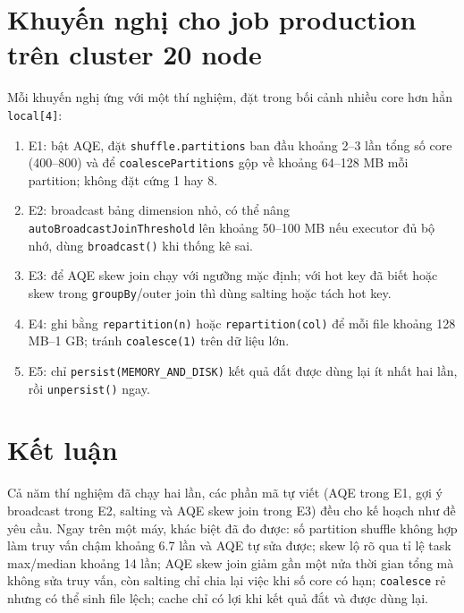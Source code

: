 \documentclass[
  12pt,
  a4paper,
]{article}
\providecommand{\tightlist}{%
  \setlength{\itemsep}{0pt}\setlength{\parskip}{0pt}}
\begin{document}
\section{Khuyến nghị cho job production trên cluster 20
node}\label{sec:l06-reco}

Mỗi khuyến nghị ứng với một thí nghiệm, đặt trong bối cảnh nhiều core
hơn hẳn \texttt{local{[}4{]}}:

\begin{enumerate}
\def\labelenumi{\arabic{enumi}.}
\tightlist
\item
  E1: bật AQE, đặt
  \texttt{shuffle.}\allowbreak{}\texttt{partitions}\allowbreak{} ban đầu
  khoảng 2--3 lần tổng số core (400--800) và để
  \texttt{coalescePartitions}\allowbreak{} gộp về khoảng 64--128 MB mỗi
  partition; không đặt cứng 1 hay 8.
\item
  E2: broadcast bảng dimension nhỏ, có thể nâng
  \texttt{autoBroadcastJoinThreshold}\allowbreak{} lên khoảng 50--100 MB
  nếu executor đủ bộ nhớ, dùng \texttt{broadcast()} khi thống kê sai.
\item
  E3: để AQE skew join chạy với ngưỡng mặc định; với hot key đã biết
  hoặc skew trong \texttt{groupBy}/outer join thì dùng salting hoặc tách
  hot key.
\item
  E4: ghi bằng \texttt{repartition(n)} hoặc
  \texttt{repartition(col)}\allowbreak{} để mỗi file khoảng 128 MB--1
  GB; tránh \texttt{coalesce(1)} trên dữ liệu lớn.
\item
  E5: chỉ
  \texttt{persist(MEMORY\_}\allowbreak{}\texttt{AND\_}\allowbreak{}\texttt{DISK)}\allowbreak{}
  kết quả đắt được dùng lại ít nhất hai lần, rồi \texttt{unpersist()}
  ngay.
\end{enumerate}

\section{Kết luận}\label{sec:l06-conclusion}

Cả năm thí nghiệm đã chạy hai lần, các phần mã tự viết (AQE trong E1,
gợi ý broadcast trong E2, salting và AQE skew join trong E3) đều cho kế
hoạch như đề yêu cầu. Ngay trên một máy, khác biệt đã đo được: số
partition shuffle không hợp làm truy vấn chậm khoảng 6.7 lần và AQE tự
sửa được; skew lộ rõ qua tỉ lệ task max/median khoảng 14 lần; AQE skew
join giảm gần một nửa thời gian tổng mà không sửa truy vấn, còn salting
chỉ chia lại việc khi số core có hạn; \texttt{coalesce} rẻ nhưng có thể
sinh file lệch; cache chỉ có lợi khi kết quả đắt và được dùng lại.
\end{document}
